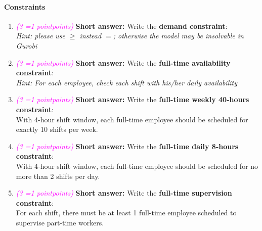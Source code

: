 \documentclass[11pt, letter, answers]{exam}
\newcommand{\grade}[1]{
    \small\textcolor{magenta}{\emph{(#1 \ifnum#1=1 point\else points\fi)}}%
    \normalsize
}
\newcommand{\saq}{\textbf{Short answer: }}
\begin{document}
\paragraph{Constraints}
\begin{enumerate}[label=(\alph*), resume]
\item \grade{3} \saq Write the \textbf{demand constraint}:
\\ \textit{Hint: please use $\boldsymbol{\geq}$ instead $=$; otherwise the model may be insolvable in Gurobi}
\begin{answerBox}[height=1.2in]

\end{answerBox}


\item \grade{3} \saq Write the \textbf{full-time availability constraint}:
\\ \textit{Hint: For each employee, check each shift with his/her daily availability}
\begin{answerBox}[height=1.2in]

\end{answerBox}


\item \grade{3} \saq Write the \textbf{full-time weekly 40-hours constraint}: 
\\With 4-hour shift window, each full-time employee should be scheduled for exactly 10 shifts per week.

\begin{answerBox}[height=1.2in]

\end{answerBox}


\item \grade{3} \saq Write the \textbf{full-time daily 8-hours constraint}: 
\\With 4-hour shift window, each full-time employee should be scheduled for no more than 2 shifts per day.

\begin{answerBox}[height=1.2in]

\end{answerBox}


\item \grade{3} \saq Write the \textbf{full-time supervision constraint}: 
\\ For each shift, there must be at least 1 full-time employee scheduled to supervise part-time workers.
\begin{answerBox}[height=1.2in]

\end{answerBox}



\end{enumerate}
\end{document}
